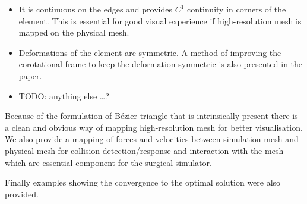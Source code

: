 \documentclass{egpubl}
\begin{document}
\begin{itemize}

    \item It is continuous on the edges and provides $C^1$ continuity in
    corners of the element. This is essential for good visual experience if
    high-resolution mesh is mapped on the physical mesh.

    \item Deformations of the element are symmetric. A method of improving
    the corotational frame to keep the deformation symmetric is also
    presented in the paper.

    \item TODO: anything else \ldots? %


\end{itemize}

Because of the formulation of Bézier triangle that is intrinsically present
there is a clean and obvious way of mapping high-resolution mesh for
better visualisation. We also provide a mapping of forces and velocities
between simulation mesh and physical mesh for collision detection/response
and interaction with the mesh which are essential component for the surgical
simulator.

Finally examples showing the convergence to the optimal solution were also provided. 



%



\end{document}
